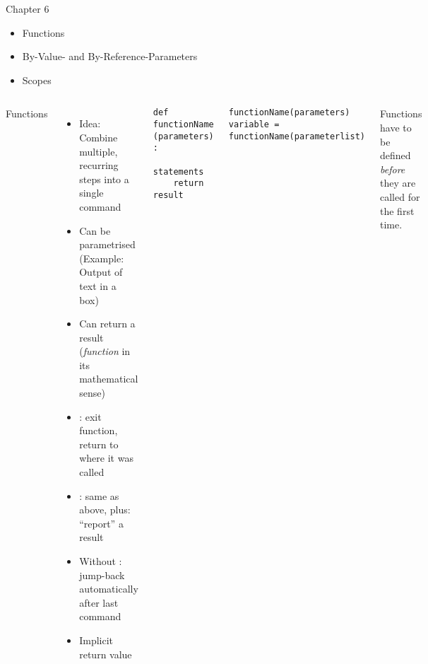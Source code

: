 
\begin{frame}[fragile]{Chapter 6}
%
\begin{itemize}
\item Functions
\item By-Value- and By-Reference-Parameters
\item Scopes
\end{itemize}
%
\end{frame}


\begin{frame}[fragile]
%
\begin{columns}[T]
\begin{Large}
{Functions}
\vspace{6pt}
\end{Large}
\begin{itemize}
\item Idea: Combine multiple, recurring steps into a single command
\item Can be parametrised (Example: Output of text in a box)
\item Can return a result (\Thus \emph{function} in its mathematical sense)
\item {}: exit function, return to where it was called
\item {}: same as above, plus: \enquote{report} a result
\item Without : jump-back automatically after last command
\item Implicit return value 
\end{itemize}
%
\begin{codebox}
\begin{verbatim}
def functionName (parameters) :
    statements
    return result
\end{verbatim}
\end{codebox}
%
\begin{codebox}
\begin{verbatim}
functionName(parameters)
variable = functionName(parameterlist)
\end{verbatim}
\end{codebox}
%
\begin{hintbox}
Functions have to be defined \emph{before} they are called for the first time.
\end{hintbox}
\end{columns}
%
\end{frame}

